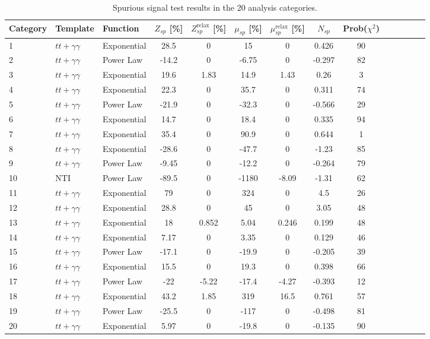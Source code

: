 \begin{table}[ht]
  \centering
  \begin{tabular}{l l l c c c c c c c c c c c}
    \hline
    Category & Template & Function & $Z_{sp}$ [\%] &  $Z_{sp}^\text{relax}$ [\%] & $\mu_{sp}$ [\%] & $\mu_{sp}^\text{relax}$ [\%] & $N_{sp}$ & Prob($\chi^2$)\\ \hline
1 & $tt+\gamma\gamma$ & Exponential & 28.5 & 0 & 15 & 0 & 0.426 & 90\\
2 & $tt+\gamma\gamma$ & Power Law & -14.2 & 0 & -6.75 & 0 & -0.297 & 82\\
3 & $tt+\gamma\gamma$ & Exponential & 19.6 & 1.83 & 14.9 & 1.43 & 0.26 & 3\\
4 & $tt+\gamma\gamma$ & Exponential & 22.3 & 0 & 35.7 & 0 & 0.311 & 74\\
5 & $tt+\gamma\gamma$ & Power Law & -21.9 & 0 & -32.3 & 0 & -0.566 & 29\\
6 & $tt+\gamma\gamma$ & Exponential & 14.7 & 0 & 18.4 & 0 & 0.335 & 94\\
7 & $tt+\gamma\gamma$ & Exponential & 35.4 & 0 & 90.9 & 0 & 0.644 & 1\\
8 & $tt+\gamma\gamma$ & Exponential & -28.6 & 0 & -47.7 & 0 & -1.23 & 85\\
9 & $tt+\gamma\gamma$ & Power Law & -9.45 & 0 & -12.2 & 0 & -0.264 & 79\\
10 & NTI & Power Law & -89.5 & 0 & -1180 & -8.09 & -1.31 & 62\\
11 & $tt+\gamma\gamma$ & Exponential & 79 & 0 & 324 & 0 & 4.5 & 26\\
12 & $tt+\gamma\gamma$ & Exponential & 28.8 & 0 & 45 & 0 & 3.05 & 48\\ \hline
13 & $tt+\gamma\gamma$ & Exponential & 18 & 0.852 & 5.04 & 0.246 & 0.199 & 48\\
14 & $tt+\gamma\gamma$ & Exponential & 7.17 & 0 & 3.35 & 0 & 0.129 & 46\\
15 & $tt+\gamma\gamma$ & Power Law & -17.1 & 0 & -19.9 & 0 & -0.205 & 39\\
16 & $tt+\gamma\gamma$ & Exponential & 15.5 & 0 & 19.3 & 0 & 0.398 & 66\\
17 & $tt+\gamma\gamma$ & Power Law & -22 & -5.22 & -17.4 & -4.27 & -0.393 & 12\\
18 & $tt+\gamma\gamma$ & Exponential & 43.2 & 1.85 & 319 & 16.5 & 0.761 & 57\\
19 & $tt+\gamma\gamma$ & Power Law & -25.5 & 0 & -117 & 0 & -0.498 & 81\\
20 & $tt+\gamma\gamma$ & Exponential & 5.97 & 0 & -19.8 & 0 & -0.135 & 90\\ \hline
    \hline
  \end{tabular}
  \caption{Spurious signal test results in the 20 analysis categories.}
  \label{tab:spuriousSignal_1}
\end{table}

